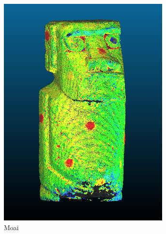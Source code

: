\documentclass[./00PhotoBox.tex]{subfiles}
\begin{document}
\begin{figure}
    \centering
    \begin{subfigure}{0.3\textwidth}
        \includegraphics[width=0.95\textwidth]{img/cam_anzahl/normal.png}
        \caption{Moai}
        \label{img:differenz_moai}
    \end{subfigure}
    \begin{subfigure}{0.3\textwidth}

\end{subfigure}
\end{figure}
\end{document}
